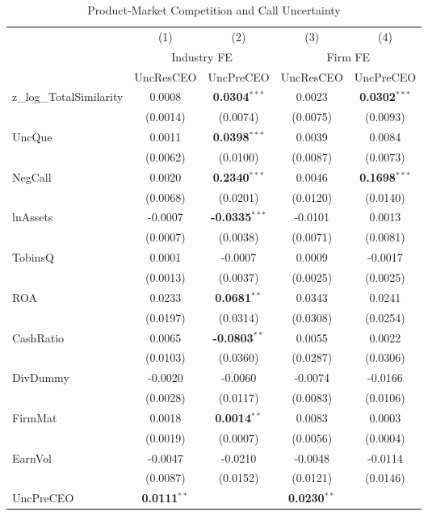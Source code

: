 \documentclass[11pt,a4paper]{article}
\begin{document}
\begin{table}[htbp]
\centering
\caption{Product-Market Competition and Call Uncertainty}
\label{tab:h23_competition_uncertainty}
\scriptsize
\begin{tabular}{lcccc}
\toprule
 & (1) & (2) & (3) & (4) \\
 & \multicolumn{2}{c}{Industry FE} & \multicolumn{2}{c}{Firm FE} \\
\cmidrule(lr){2-3} \cmidrule(lr){4-5}
 & UncResCEO & UncPreCEO & UncResCEO & UncPreCEO \\
\midrule
z\_log\_TotalSimilarity & 0.0008 & \textbf{0.0304}$^{***}$ & 0.0023 & \textbf{0.0302}$^{***}$ \\
 & (0.0014) & (0.0074) & (0.0075) & (0.0093) \\
\midrule
UncQue & 0.0011 & \textbf{0.0398}$^{***}$ & 0.0039 & 0.0084 \\
 & (0.0062) & (0.0100) & (0.0087) & (0.0073) \\
NegCall & 0.0020 & \textbf{0.2340}$^{***}$ & 0.0046 & \textbf{0.1698}$^{***}$ \\
 & (0.0068) & (0.0201) & (0.0120) & (0.0140) \\
lnAssets & -0.0007 & \textbf{-0.0335}$^{***}$ & -0.0101 & 0.0013 \\
 & (0.0007) & (0.0038) & (0.0071) & (0.0081) \\
TobinsQ & 0.0001 & -0.0007 & 0.0009 & -0.0017 \\
 & (0.0013) & (0.0037) & (0.0025) & (0.0025) \\
ROA & 0.0233 & \textbf{0.0681}$^{**}$ & 0.0343 & 0.0241 \\
 & (0.0197) & (0.0314) & (0.0308) & (0.0254) \\
CashRatio & 0.0065 & \textbf{-0.0803}$^{**}$ & 0.0055 & 0.0022 \\
 & (0.0103) & (0.0360) & (0.0287) & (0.0306) \\
DivDummy & -0.0020 & -0.0060 & -0.0074 & -0.0166 \\
 & (0.0028) & (0.0117) & (0.0083) & (0.0106) \\
FirmMat & 0.0018 & \textbf{0.0014}$^{**}$ & 0.0083 & 0.0003 \\
 & (0.0019) & (0.0007) & (0.0056) & (0.0004) \\
EarnVol & -0.0047 & -0.0210 & -0.0048 & -0.0114 \\
 & (0.0087) & (0.0152) & (0.0121) & (0.0146) \\
UncPreCEO & \textbf{0.0111}$^{**}$ &  & \textbf{0.0230}$^{**}$ &  \\

\end{tabular}
\end{table}
\end{document}
